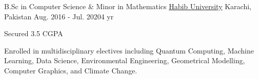 

\begin{cventries}

  \cventry
    {B.Sc in Computer Science \& Minor in Mathematics} %
    {\href{https://habib.edu.pk}{Habib University}} %
    {Karachi, Pakistan} %
    {Aug. 2016 - Jul. 2020{\enskip\cdotp\enskip}4 yr} %
    {
      \begin{cvitems} %
        \item {Secured 3.5 CGPA}
        \item {Enrolled in multidisciplinary electives including Quantum Computing, Machine Learning, Data Science, Environmental Engineering, Geometrical Modelling, Computer Graphics, and Climate Change.}
      \end{cvitems}
    }

\end{cventries}
